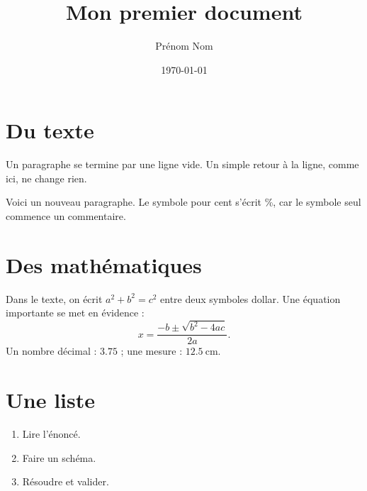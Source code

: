 \documentclass[12pt]{article}   %
\title{Mon premier document}
\author{Prénom Nom}
\date{\today}
\begin{document}
\maketitle

\section{Du texte}

Un paragraphe se termine par une ligne vide.
Un simple retour à la ligne, comme ici, ne change rien.

Voici un nouveau paragraphe. Le symbole pour cent s'écrit \%,
car le symbole seul commence un commentaire. %

\section{Des mathématiques}

Dans le texte, on écrit $a^2 + b^2 = c^2$ entre deux symboles dollar.
Une équation importante se met en évidence :
\[
  x = \frac{-b \pm \sqrt{b^2 - 4ac}}{2a}.
\]
Un nombre décimal : $\num{3,75}$ ; une mesure : $\qty{12,5}{\centi\metre}$.

\section{Une liste}

\begin{enumerate}
  \item Lire l'énoncé.
  \item Faire un schéma.
  \item Résoudre et valider.
\end{enumerate}
\end{document}
